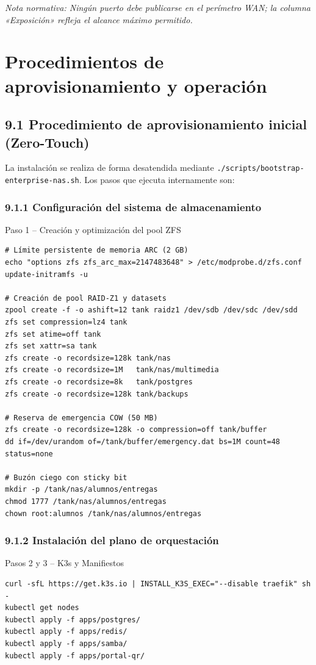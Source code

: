 \documentclass[10pt,a4paper]{article}
\begin{document}
{\footnotesize\textit{Nota normativa: Ningún puerto debe publicarse en el perímetro WAN; la columna «Exposición» refleja el alcance máximo permitido.}}

\newpage
\section{Procedimientos de aprovisionamiento y operación}

\subsection{9.1 Procedimiento de aprovisionamiento inicial (Zero-Touch)}
La instalación se realiza de forma desatendida mediante \texttt{./scripts/bootstrap-enterprise-nas.sh}. Los pasos que ejecuta internamente son:

\subsubsection{9.1.1 Configuración del sistema de almacenamiento}
\begin{stepbox}{Paso 1 – Creación y optimización del pool ZFS}
\begin{verbatim}
# Límite persistente de memoria ARC (2 GB)
echo "options zfs zfs_arc_max=2147483648" > /etc/modprobe.d/zfs.conf
update-initramfs -u

# Creación de pool RAID-Z1 y datasets
zpool create -f -o ashift=12 tank raidz1 /dev/sdb /dev/sdc /dev/sdd
zfs set compression=lz4 tank
zfs set atime=off tank
zfs set xattr=sa tank
zfs create -o recordsize=128k tank/nas
zfs create -o recordsize=1M   tank/nas/multimedia
zfs create -o recordsize=8k   tank/postgres
zfs create -o recordsize=128k tank/backups

# Reserva de emergencia COW (50 MB)
zfs create -o recordsize=128k -o compression=off tank/buffer
dd if=/dev/urandom of=/tank/buffer/emergency.dat bs=1M count=48 status=none

# Buzón ciego con sticky bit
mkdir -p /tank/nas/alumnos/entregas
chmod 1777 /tank/nas/alumnos/entregas
chown root:alumnos /tank/nas/alumnos/entregas
\end{verbatim}
\end{stepbox}

\subsubsection{9.1.2 Instalación del plano de orquestación}
\begin{stepbox}{Pasos 2 y 3 – K3s y Manifiestos}
\begin{verbatim}
curl -sfL https://get.k3s.io | INSTALL_K3S_EXEC="--disable traefik" sh -
kubectl get nodes
kubectl apply -f apps/postgres/
kubectl apply -f apps/redis/
kubectl apply -f apps/samba/
kubectl apply -f apps/portal-qr/
\end{verbatim}
\end{stepbox}
\end{document}
